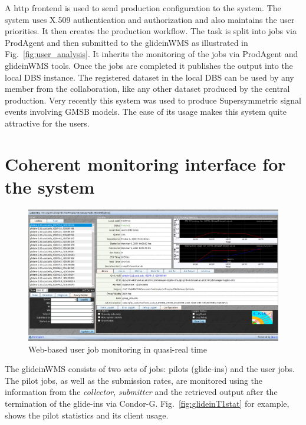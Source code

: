 \documentclass[a4paper]{jpconf}
\begin{document}
A http frontend is used to send production configuration to the system. 
The system uses X.509 authentication and authorization and also maintains the user priorities. 
It then creates the production workflow. The task is split into jobs via ProdAgent and then 
submitted to the glideinWMS as illustrated in Fig.~\ref{fig:user_analysis}. It inherits the monitoring of the 
jobs via ProdAgent and glideinWMS tools. 
Once the jobs are completed it publishes the output into the local DBS instance. The registered 
dataset in the local DBS can be used by any member from the collaboration, like any other dataset produced 
by the central production. Very recently this system was used to produce Supersymmetric signal
events involving GMSB models. The ease of its usage makes this system quite attractive
for the users.
\section{Coherent monitoring interface for the system}
\begin{figure}
\begin{center}
\includegraphics[scale=0.4]{jobMon.png}
\end{center}
\caption{Web-based user job monitoring in quasi-real time}
\label{fig:jobMon}
\end{figure}
The glideinWMS consists of two sets of jobs: pilots (glide-ins) and the user jobs. The
pilot jobs, as well as the submission rates, are monitored using the information from the \emph{collector},
\emph{submitter} and the retrieved output after the termination of the glide-ins via Condor-G.
Fig.~\ref{fig:glideinT1stat} for example, shows the pilot statistics and its client usage.
\end{document}
